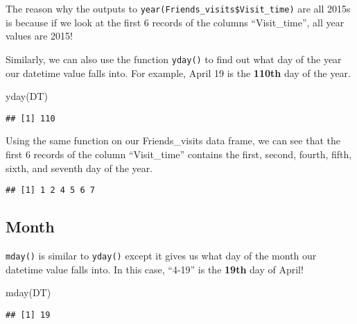 \documentclass[
]{book}
\newenvironment{Shaded}{\begin{snugshade}}{\end{snugshade}}
\newcommand{\FunctionTok}[1]{\textcolor[rgb]{0.00,0.00,0.00}{#1}}
\newcommand{\NormalTok}[1]{#1}
\newcommand{\SpecialCharTok}[1]{\textcolor[rgb]{0.00,0.00,0.00}{#1}}
\begin{document}
The reason why the outputs to \texttt{year(Friends\_visits\$Visit\_time)} are all 2015s is because if we look at the first 6 records of the columns ``Visit\_time'', all year values are 2015!

Similarly, we can also use the function \texttt{yday()} to find out what day of the year our datetime value falls into. For example, April 19 is the \textbf{110th} day of the year.

\begin{Shaded}
\begin{Highlighting}[]
\FunctionTok{yday}\NormalTok{(DT)}
\end{Highlighting}
\end{Shaded}

\begin{verbatim}
## [1] 110
\end{verbatim}

Using the same function on our Friends\_visits data frame, we can see that the first 6 records of the column ``Visit\_time'' contains the first, second, fourth, fifth, sixth, and seventh day of the year.

\begin{Shaded}
\end{Shaded}

\begin{verbatim}
## [1] 1 2 4 5 6 7
\end{verbatim}

\hypertarget{month}{%
\subsection{Month}\label{month}}

\texttt{mday()} is similar to \texttt{yday()} except it gives us what day of the month our datetime value falls into. In this case, ``4-19'' is the \textbf{19th} day of April!

\begin{Shaded}
\begin{Highlighting}[]
\FunctionTok{mday}\NormalTok{(DT)}
\end{Highlighting}
\end{Shaded}

\begin{verbatim}
## [1] 19
\end{verbatim}
\end{document}
